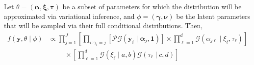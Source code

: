 Let $\theta = (\bm{\alpha},\bm{\xi},\bm{\tau})$ be a subset of parameters for which the distribution will be approximated via variational inference,
and $\phi = (\bm{\gamma},\bm{\nu})$ be the latent parameters that will be sampled via their full conditional distributions.  Then,
\begin{equation}
    \begin{aligned}
        f(\bm{y},\theta\mid\phi) &\propto \mathcal \prod_{j = 1}^J\left[\prod_{i:\gamma_i = j}\left[\mathcal{PG}(\bm{y}_i\mid\bm{\alpha}_j,\bm{1})\right]\times\prod_{\ell = 1}^d\mathcal{G}(\alpha_{j\ell}\mid\xi_{\ell},\tau_{\ell})\right] \\
        &\hspace{1cm}\times \left[\prod_{\ell = 1}^d\mathcal{G}(\xi_{\ell}\mid a, b)\mathcal{G}(\tau_{\ell}\mid c,d)\right]        
    \end{aligned}
\end{equation}

\cite{tran2021}

